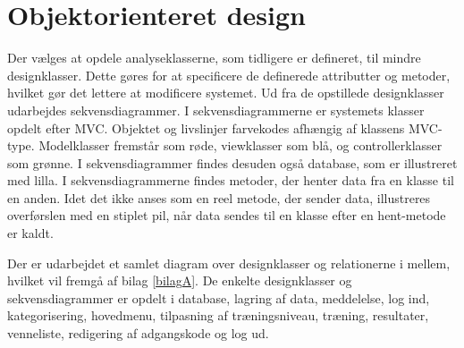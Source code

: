 \section{Objektorienteret design}
Der vælges at opdele analyseklasserne, som tidligere er defineret, til mindre designklasser. Dette gøres for at specificere de definerede attributter og metoder, hvilket gør det lettere at modificere systemet. Ud fra de opstillede designklasser udarbejdes sekvensdiagrammer. I sekvensdiagrammerne er systemets klasser opdelt efter MVC. Objektet og livslinjer farvekodes afhængig af klassens MVC-type. Modelklasser fremstår som røde, viewklasser som blå, og controllerklasser som grønne. I sekvensdiagrammer findes desuden også database, som er illustreret med lilla. I sekvensdiagrammerne findes metoder, der henter data fra en klasse til en anden. Idet det ikke anses som en reel metode, der sender data, illustreres overførslen med en stiplet pil, når data sendes til en klasse efter en hent-metode er kaldt. 

Der er udarbejdet et samlet diagram over designklasser og relationerne i mellem, hvilket vil fremgå af bilag \ref{bilagA}. De enkelte designklasser og sekvensdiagrammer er opdelt i database, lagring af data, meddelelse, log ind, kategorisering, hovedmenu, tilpasning af træningsniveau, træning, resultater, venneliste, redigering af adgangskode og log ud. 
